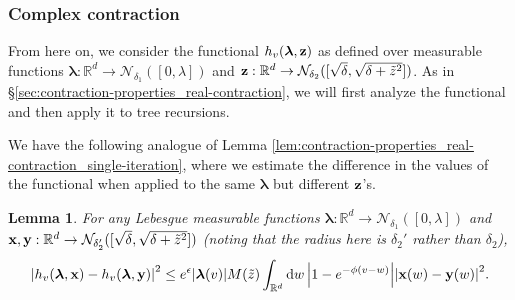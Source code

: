 \documentclass[11pt]{article}
\newcommand{\R}{\mathbb R}
\newcommand{\bl}{\bm{\lambda}}
\newcommand{\bx}{\vb{x}}
\newcommand{\by}{\vb{y}}
\newcommand{\bz}{\vb{z}}
\newcommand{\tz}{\tilde{z}}
\numberwithin{equation}{section}
\theoremstyle{plain}
\newtheorem{lemma}[theorem]{Lemma}
\theoremstyle{definition}
\theoremstyle{remark}
\begin{document}
\subsubsection{Complex contraction}

From here on, we consider the functional $h_{v}(\bl,\bz)$ as defined over measurable functions $\bl:\R^{d}\rightarrow\mathcal{N}_{\delta_{1}}([0,\lambda])$ and $\bz:\R^{d}\rightarrow\mathcal{N}_{\delta_{2}}([\sqrt{\delta},\sqrt{\delta+\tz^{2}}])$.
As in \S\ref{sec:contraction-properties_real-contraction}, we will first analyze the functional and then apply it to tree recursions.

We have the following analogue of Lemma \ref{lem:contraction-properties_real-contraction_single-iteration}, where we estimate the difference in the values of the functional when applied to the same $\bl$ but different $\bz$'s.

\begin{lemma}
\label{lem:contraction-properties_complex-contraction_single-iteration}
For any Lebesgue measurable functions $\bl:\R^{d}\rightarrow\mathcal{N}_{\delta_{1}}([0,\lambda])$ and $\bx,\by:\R^{d}\rightarrow\mathcal{N}_{\delta_{2}'}([\sqrt{\delta},\sqrt{\delta+\tz^{2}}])$ (noting that the radius here is $\delta_{2}'$ rather than $\delta_{2}$),
\begin{equation}
\label{eqn:contraction-properties_complex-contraction_single-iteration}
\abs{h_{v}(\bl,\bx)-h_{v}(\bl,\by)}^{2}
\le e^{\epsilon}\abs{\bl(v)}M(\tilde{z})\int_{\R^{d}}\dd{w}\abs{1-e^{-\phi(v-w)}}\abs{\bx(w)-\by(w)}^{2}.
\end{equation}
\end{lemma}
\end{document}
